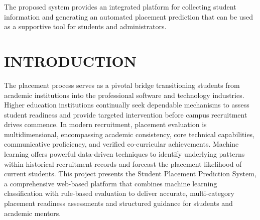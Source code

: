 \documentclass[12pt,a4paper]{report}
\begin{document}
\vspace{0.15cm}

\noindent
The proposed system provides an integrated platform for
collecting student information and generating an automated
placement prediction that can be used as a supportive tool for
students and administrators.


\newpage
\thispagestyle{empty}

\tableofcontents


\newpage
\thispagestyle{empty}

\listoffigures


\newpage
\thispagestyle{empty}

\listoftables


\clearpage

\setcounter{page}{1}
\pagestyle{fancy}


\chapter{INTRODUCTION}

The placement process serves as a pivotal bridge transitioning students from
academic institutions into the professional software and technology industries.
Higher education institutions continually seek dependable mechanisms to assess
student readiness and provide targeted intervention before campus recruitment
drives commence. In modern recruitment, placement evaluation is multidimensional,
encompassing academic consistency, core technical capabilities, communicative
proficiency, and verified co-curricular achievements. Machine learning offers
powerful data-driven techniques to identify underlying patterns within
historical recruitment records and forecast the placement likelihood of current
students. This project presents the Student Placement Prediction System, a
comprehensive web-based platform that combines machine learning classification
with rule-based evaluation to deliver accurate, multi-category placement
readiness assessments and structured guidance for students and academic
mentors.
\end{document}

